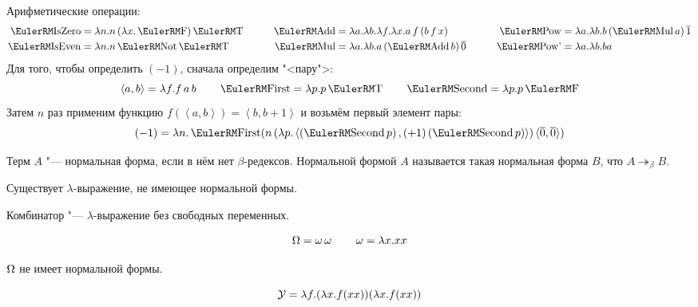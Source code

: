 Арифметические операции:
\begin{align*}
    \func{IsZero} &= \lambda{}n.n\mathinner{(\lambda{}x.\F)}\T &\qquad
    \func{Add}    &= \lambda{}a.\lambda{}b.\lambda{}f.\lambda{}x.a \mathinner{f} (b \mathinner{f} x) &\qquad
    \func{Pow}    &= \lambda{}a.\lambda{}b.b \mathinner{(\func{Mul} a)} \mathinner{\overline{1}} \\
    \func{IsEven} &= \lambda{}n.n \Not \T &\qquad
    \func{Mul}    &= \lambda{}a.\lambda{}b.a \mathinner{(\func{Add} b)} \mathinner{\overline{0}} &\qquad
    \func{Pow'}   &= \lambda{}a.\lambda{}b.b a
\end{align*}
Для того, чтобы определить $(-1)$, сначала определим "<пару">:
\[
    \left<a,b\right> = \lambda f.f \mathinner{a} b \qquad
    \func{First} = \lambda p . p \T \qquad
    \func{Second} = \lambda p . p \F
\]%
Затем $n$ раз применим функцию $f\left(\left<a,b\right>\right) = \left<b,b+1\right>$ и возьмём первый элемент пары:
\[
    (-1) = \lambda n . \func{First}
        (n \mathinner{(\lambda p . \left<\left(\func{Second} p\right), \mathinner{(+1)} (\func{Second} p)\right>)}
        \langle\overline{0},\overline{0}\rangle)
\]

\begin{definition}
    Терм $A$ "--- нормальная форма, если в нём нет $\beta$-редексов.
    Нормальной формой $A$ называется такая нормальная форма $B$, что $A \twoheadrightarrow_{\beta} B$.
\end{definition}

\begin{statement}
    Существует $\lambda$-выражение, не имеющее нормальной формы.
\end{statement}

\begin{definition}[комбинатор]
    Комбинатор "--- $\lambda$-выражение без свободных переменных.
\end{definition}

\begin{definition}
\[
    \operatorname{\Omega} = \operatorname{\omega} \operatorname{\omega} \qquad
    \operatorname{\omega} = \lambda x . x x
\]
\end{definition}

$\operatorname{\Omega}$ не имеет нормальной формы.

\begin{definition}
    \[
        \operatorname{\mathcal{Y}} = \lambda f . (\lambda x . f (x x)) (\lambda x . f (x x))
    \]
\end{definition}

